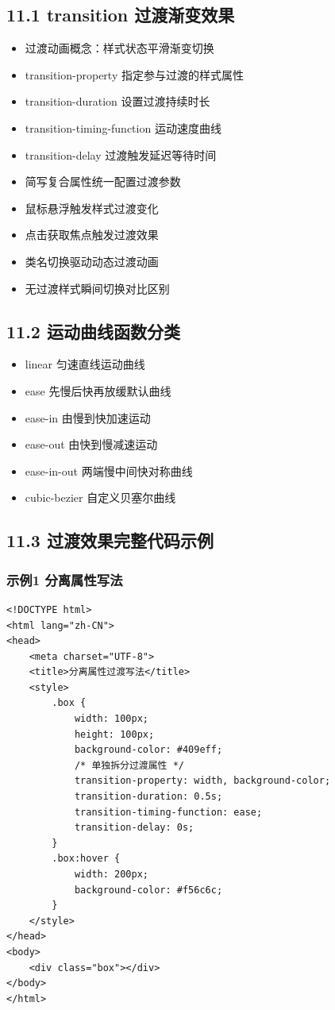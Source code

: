 
\subsection{11.1 transition 过渡渐变效果}
\begin{itemize}[leftmargin=*]
\item 过渡动画概念：样式状态平滑渐变切换
\item transition-property 指定参与过渡的样式属性
\item transition-duration 设置过渡持续时长
\item transition-timing-function 运动速度曲线
\item transition-delay 过渡触发延迟等待时间
\item 简写复合属性统一配置过渡参数
\item 鼠标悬浮触发样式过渡变化
\item 点击获取焦点触发过渡效果
\item 类名切换驱动动态过渡动画
\item 无过渡样式瞬间切换对比区别
\end{itemize}

\subsection{11.2 运动曲线函数分类}
\begin{itemize}[leftmargin=*]
\item linear 匀速直线运动曲线
\item ease 先慢后快再放缓默认曲线
\item ease-in 由慢到快加速运动
\item ease-out 由快到慢减速运动
\item ease-in-out 两端慢中间快对称曲线
\item cubic-bezier 自定义贝塞尔曲线
\end{itemize}

\subsection{11.3 过渡效果完整代码示例}
\subsubsection{示例1 分离属性写法}
\begin{verbatim}
<!DOCTYPE html>
<html lang="zh-CN">
<head>
    <meta charset="UTF-8">
    <title>分离属性过渡写法</title>
    <style>
        .box {
            width: 100px;
            height: 100px;
            background-color: #409eff;
            /* 单独拆分过渡属性 */
            transition-property: width, background-color;
            transition-duration: 0.5s;
            transition-timing-function: ease;
            transition-delay: 0s;
        }
        .box:hover {
            width: 200px;
            background-color: #f56c6c;
        }
    </style>
</head>
<body>
    <div class="box"></div>
</body>
</html>
\end{verbatim}

